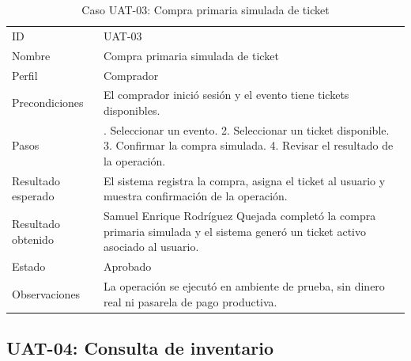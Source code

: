 \documentclass[12pt,letterpaper]{article}
\begin{document}
\begin{table}[H]
\centering
\begingroup
\footnotesize
\setlength{\tabcolsep}{3pt}
\renewcommand{\arraystretch}{1.25}

\begin{tabularx}{\textwidth}{|
>{\raggedright\arraybackslash}p{3.4cm}|
>{\raggedright\arraybackslash}X|}
\hline
\multicolumn{1}{|>{\centering\arraybackslash}m{3.4cm}|}{\textbf{Campo}} &
\multicolumn{1}{>{\centering\arraybackslash}m{10.8cm}|}{\textbf{Contenido}} \\
\hline
ID & UAT-03 \\
\hline
Nombre & Compra primaria simulada de ticket \\
\hline
Perfil & Comprador \\
\hline
Precondiciones & El comprador inició sesión y el evento tiene tickets disponibles. \\
\hline
Pasos & 1. Seleccionar un evento. 2. Seleccionar un ticket disponible. 3. Confirmar la compra simulada. 4. Revisar el resultado de la operación. \\
\hline
Resultado esperado & El sistema registra la compra, asigna el ticket al usuario y muestra confirmación de la operación. \\
\hline
Resultado obtenido & Samuel Enrique Rodríguez Quejada completó la compra primaria simulada y el sistema generó un ticket activo asociado al usuario. \\
\hline
Estado & Aprobado \\
\hline
Observaciones & La operación se ejecutó en ambiente de prueba, sin dinero real ni pasarela de pago productiva. \\
\hline
\end{tabularx}

\endgroup
\caption{Caso UAT-03: Compra primaria simulada de ticket}
\label{tab:uat-03-compra-primaria}
\end{table}

\subsection{UAT-04: Consulta de inventario}
\end{document}
